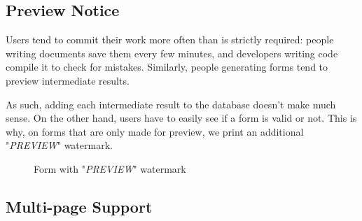 \documentclass[11pt, a4paper]{report}
\begin{document}
\subsection{Preview Notice}

Users tend to commit their work more often than is strictly required: people writing documents save them every few minutes, and developers writing code compile it to check for mistakes. Similarly, people generating forms tend to preview intermediate results.

As such, adding each intermediate result to the database doesn't make much sense. On the other hand, users have to easily see if a form is valid or not. This is why, on forms that are only made for preview, we print an additional "\textit{PREVIEW}" watermark.


\begin{figure}[!h]
    \centering
    \caption{Form with "\textit{PREVIEW}" watermark}
    \label{fig:label3}
\end{figure}

\subsection{Multi-page Support}
\end{document}
